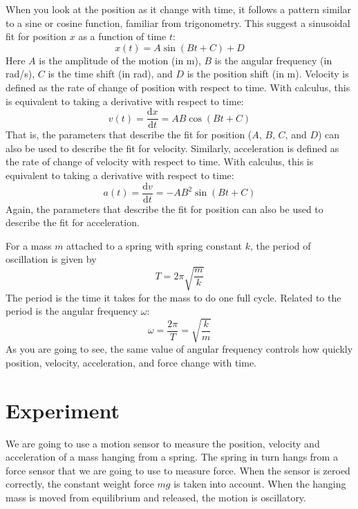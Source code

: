 When you look at the position as it change with time, it follows a pattern similar to a sine or cosine function, familiar from trigonometry. This suggest a sinusoidal fit for position $x$ as a function of time $t$:
\begin{equation}
    x(t) = A \sin{\left( Bt + C \right)} + D
\end{equation}
Here $A$ is the amplitude of the motion (in m), $B$ is the angular frequency (in rad/s), $C$ is the time shift (in rad), and $D$ is the position shift (in m). Velocity is defined as the rate of change of position with respect to time. With calculus, this is equivalent to taking a derivative with respect to time:
\begin{equation} \label{eq.11.v}
    v(t) = \frac{\mathrm{d} x}{\mathrm{d} t} = AB \cos{\left( Bt + C \right)}
\end{equation}
That is, the parameters that describe the fit for position ($A$, $B$, $C$, and $D$) can also be used to describe the fit for velocity. Similarly, acceleration is defined as the rate of change of velocity with respect to time. With calculus, this is equivalent to taking a derivative with respect to time:
\begin{equation} \label{eq.11.a}
    a(t) = \frac{\mathrm{d} v}{\mathrm{d} t} = -AB^{2} \sin{\left( Bt + C \right)}
\end{equation}
Again, the parameters that describe the fit for position can also be used to describe the fit for acceleration.

For a mass $m$ attached to a spring with spring constant $k$, the period of oscillation is given by
\begin{equation}
    T = 2\pi \sqrt{\frac{m}{k}}
\end{equation}
The period is the time it takes for the mass to do one full cycle. Related to the period is the angular frequency $\omega$:
\begin{equation} \label{eq.11.omega}
    \omega = \frac{2 \pi}{T} = \sqrt{\frac{k}{m}}
\end{equation}
As you are going to see, the same value of angular frequency controls how quickly position, velocity, acceleration, and force change with time.
\section{Experiment}
We are going to use a motion sensor to measure the position, velocity and acceleration of a mass hanging from a spring. The spring in turn hangs from a force sensor that we are going to use to measure force. When the sensor is zeroed correctly, the constant weight force $mg$ is taken into account. When the hanging mass is moved from equilibrium and released, the motion is oscillatory.


